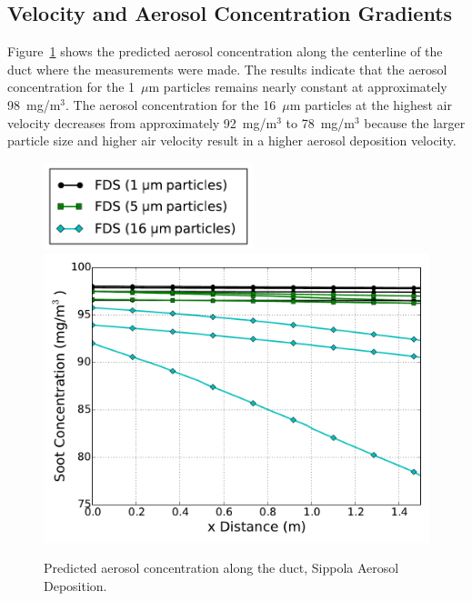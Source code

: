 \subsection{Velocity and Aerosol Concentration Gradients}

Figure~\ref{fig:Sippola_Aerosol_Deposition_Concentration} shows the predicted aerosol concentration along the centerline of the duct where the measurements were made. The results indicate that the aerosol concentration for the 1~$\mu$m particles remains nearly constant at approximately 98~mg/m$^3$. The aerosol concentration for the 16~$\mu$m particles at the highest air velocity decreases from approximately 92~mg/m$^3$ to 78~mg/m$^3$ because the larger particle size and higher air velocity result in a higher aerosol deposition velocity.

\begin{figure}[!ht]
\centering
\includegraphics[width=2.4in]{Fig_Sippola_Aerosol_Deposition_Legend_Lines.pdf} \\
\includegraphics[width=5.0in]{Fig_Sippola_Aerosol_Deposition_Soot_Concentration_All.pdf}
\caption[Predicted aerosol concentration, Sippola Aerosol Deposition]
{Predicted aerosol concentration along the duct, Sippola Aerosol Deposition.}
\label{fig:Sippola_Aerosol_Deposition_Concentration}
\end{figure}

